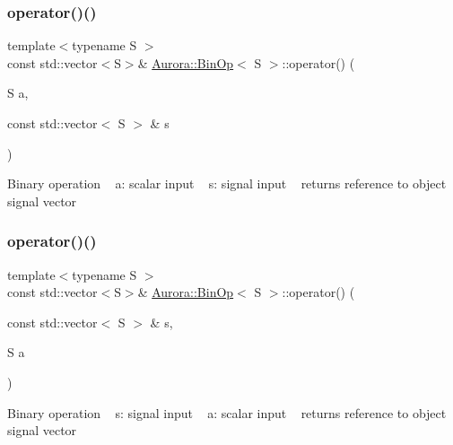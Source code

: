 \subsubsection{\texorpdfstring{operator()()}{operator()()}\hspace{0.1cm}{\footnotesize\ttfamily [1/3]}}
{\footnotesize\ttfamily template$<$typename S $>$ \\
const std\+::vector$<$S$>$\& \hyperlink{class_aurora_1_1_bin_op}{Aurora\+::\+Bin\+Op}$<$ S $>$\+::operator() (\begin{DoxyParamCaption}\item[{S}]{a,  }\item[{const std\+::vector$<$ S $>$ \&}]{s }\end{DoxyParamCaption})\hspace{0.3cm}{\ttfamily [inline]}}

Binary operation ~\newline
a\+: scalar input ~\newline
s\+: signal input ~\newline
returns reference to object signal vector \mbox{\label{class_aurora_1_1_bin_op_a488095df0eb9f16da6643476dec9e51c}} 
\subsubsection{\texorpdfstring{operator()()}{operator()()}\hspace{0.1cm}{\footnotesize\ttfamily [2/3]}}
{\footnotesize\ttfamily template$<$typename S $>$ \\
const std\+::vector$<$S$>$\& \hyperlink{class_aurora_1_1_bin_op}{Aurora\+::\+Bin\+Op}$<$ S $>$\+::operator() (\begin{DoxyParamCaption}\item[{const std\+::vector$<$ S $>$ \&}]{s,  }\item[{S}]{a }\end{DoxyParamCaption})\hspace{0.3cm}{\ttfamily [inline]}}

Binary operation ~\newline
s\+: signal input ~\newline
a\+: scalar input ~\newline
returns reference to object signal vector \mbox{\label{class_aurora_1_1_bin_op_abe8a0b7666caeda012d9ac18f889e116}} 
